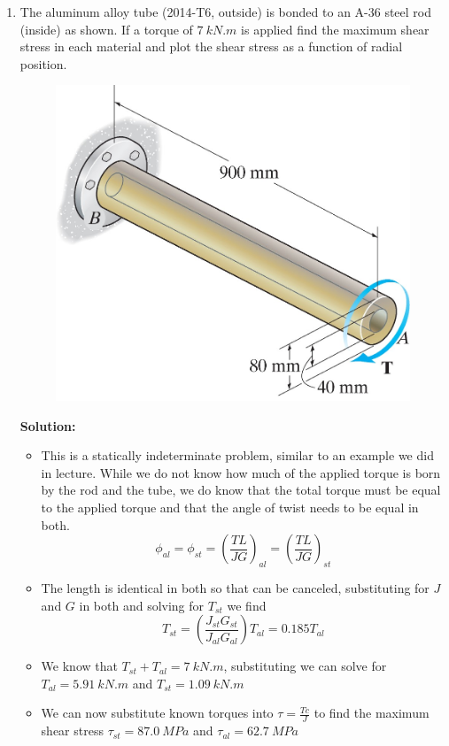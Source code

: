\documentclass[12pt, oneside]{article}
\begin{document}
\begin{enumerate}
	\item %
		The aluminum alloy tube (2014-T6, outside) is bonded to an A-36 steel rod (inside) as shown.
		If a torque of $\SI{7 }{kN.m}$ is applied find the maximum shear stress in each material and plot the shear stress as a function of radial position.
		\begin{figure}[H]
			\centering
			\includegraphics[width=0.6\linewidth]{5-86}
		\end{figure}
		\textbf{Solution:}
		\begin{itemize}
			\item This is a statically indeterminate problem, similar to an example we did in lecture. While we do not know how much of the applied torque is born by the rod and the tube, we do know that the total torque must be equal to the applied torque and that the angle of twist needs to be equal in both.
				\begin{equation*}
					\phi_{al} = \phi_{st} = \left( \frac{TL}{JG} \right)_{al} = \left( \frac{TL}{JG} \right)_{st}
				\end{equation*}
			\item The length is identical in both so that can be canceled, substituting for $J$ and $G$ in both and solving for $T_{st}$ we find
				\begin{equation*}
					T_{st} = \left( \frac{J_{st}G_{st}}{J_{al}G_{al}} \right) T_{al} = 0.185 T_{al}
				\end{equation*}
			\item We know that $T_{st} + T_{al} = \SI{7}{kN.m}$, substituting we can solve for $T_{al} = \SI{5.91}{kN.m}$ and $T_{st} = \SI{1.09}{kN.m}$
			\item We can now substitute known torques into $\tau = \frac{Tc}{J}$ to find the maximum shear stress $\tau_{st} = \SI{87.0}{MPa}$ and $\tau_{al} = \SI{62.7}{MPa}$
				\begin{figure}[H]

\end{figure}
\end{itemize}
\end{enumerate}
\end{document}
